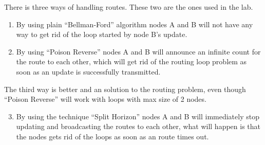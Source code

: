 \documentclass{mall}
\begin{document}
There is three ways of handling routes. These two are the ones used in the lab.
\begin{enumerate}
	\item By using plain ``Bellman-Ford'' algorithm nodes A and B will not have any way to get rid of the loop started by node B's update. 
	\item By using ``Poison Reverse'' nodes A and B will announce an infinite count for the route to each other, which will get rid of the routing loop problem as soon as an update is successfully transmitted.
\end{enumerate}
The third way is better and an solution to the routing problem, even though ``Poison Reverse'' will work with loops with max size of 2 nodes.
\begin{enumerate}
	\setcounter{enumi}{2}
	\item By using the technique ``Split Horizon'' nodes A and B will immediately stop updating and broadcasting the routes to each other, what will happen is that the nodes gets rid of the loops as soon as an route times out. 
\end{enumerate}
\end{document}
